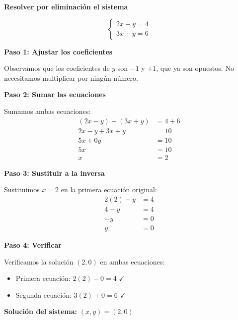 \begin{example}
\textbf{Resolver por eliminación el sistema}

$$\begin{cases}
2x - y = 4 \\
3x + y = 6
\end{cases}$$

\textbf{Paso 1: Ajustar los coeficientes}

Observamos que los coeficientes de $y$ son $-1$ y $+1$, que ya son opuestos. No necesitamos multiplicar por ningún número.

\textbf{Paso 2: Sumar las ecuaciones}

Sumamos ambas ecuaciones:
\begin{align*}
(2x - y) + (3x + y) &= 4 + 6 \\
2x - y + 3x + y &= 10 \\
5x + 0y &= 10 \\
5x &= 10 \\
x &= 2
\end{align*}

\textbf{Paso 3: Sustituir a la inversa}

Sustituimos $x = 2$ en la primera ecuación original:
\begin{align*}
2(2) - y &= 4 \\
4 - y &= 4 \\
-y &= 0 \\
y &= 0
\end{align*}

\textbf{Paso 4: Verificar}

Verificamos la solución $(2, 0)$ en ambas ecuaciones:
\begin{itemize}
    \item Primera ecuación: $2(2) - 0 = 4$ \quad $\checkmark$
    \item Segunda ecuación: $3(2) + 0 = 6$ \quad $\checkmark$
\end{itemize}

\textbf{Solución del sistema:} $(x, y) = (2, 0)$
\end{example}

\newpage

